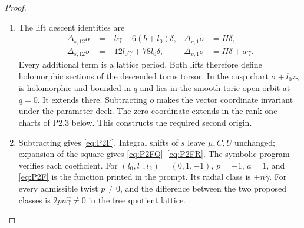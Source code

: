 \begin{proof}
\begin{enumerate}[label=\arabic*.,leftmargin=*]
\item The lift descent identities are
\begin{align*}
 \Delta_{s,12}o&=-b\gamma+6(b+l_0)\delta,&\Delta_{v,1}o&=H\delta,\\
 \Delta_{s,12}\sigma&=-12l_0\gamma+78l_0\delta,&\Delta_{v,1}\sigma&=H\delta+a\gamma.
\end{align*}
Every additional term is a lattice period. Both lifts therefore define holomorphic sections of the descended torus torsor. In the cusp chart $\sigma+l_0z_\gamma$ is holomorphic and bounded in $q$ and lies in the smooth toric open orbit at $q=0$. It extends there. Subtracting $o$ makes the vector coordinate invariant under the parameter deck. The zero coordinate extends in the rank-one charts of P2.3 below. This constructs the required second origin.

\item Subtracting gives \eqref{eq:P2F}. Integral shifts of $s$ leave $\mu,C,U$ unchanged; expansion of the square gives \eqref{eq:P2FQ}--\eqref{eq:P2FR}. The symbolic program verifies each coefficient. For $(l_0,l_1,l_2)=(0,1,-1)$, $p=-1$, $a=1$, and \eqref{eq:P2F} is the function printed in the prompt. Its radial class is $+n\widehat\gamma$. For every admissible twist $p\ne0$, and the difference between the two proposed classes is $2pn\widehat\gamma\ne0$ in the free quotient lattice.
\end{enumerate}
\end{proof}

